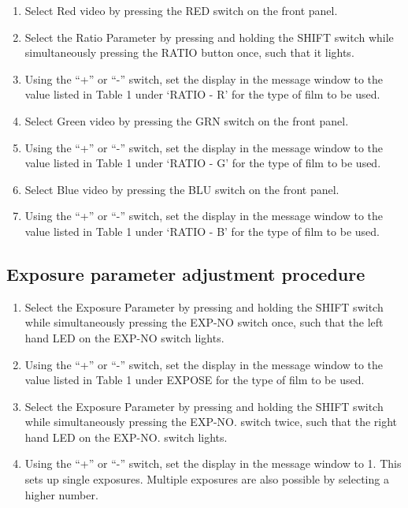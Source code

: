 \begin {enumerate}

\item Select Red video by pressing the RED switch on the front panel.

\item Select the Ratio Parameter by pressing and holding the SHIFT switch 
while simultaneously pressing the RATIO button once, such that it 
lights.

\item Using the ``+'' or ``-'' switch, set the display in the message window to
the value listed in Table 1 under `RATIO - R' for the type of film
to be used.

\item Select Green video by pressing the GRN switch on the front panel.

\item Using the ``+'' or ``-'' switch, set the display in the message window 
to the value listed in Table 1 under `RATIO - G' for the type 
of film to be used.

\item Select Blue video by pressing the BLU switch on the front panel.

\item Using the ``+'' or ``-'' switch, set the display in the message window to
the value listed in Table 1 under `RATIO - B' for the type of film 
to be used.

\end{enumerate}

\subsection {\bf Exposure parameter adjustment procedure}

\begin{enumerate}

\item Select the Exposure Parameter by pressing and holding the SHIFT switch
while simultaneously pressing the EXP-NO switch once, such that the
left hand LED on the EXP-NO switch lights.

\item Using the ``+'' or ``-'' switch, set the display in the message window to
the value listed in Table 1 under EXPOSE for the type of film to be
used.           
             
\item Select the Exposure Parameter by pressing and holding the SHIFT switch
while simultaneously pressing the EXP-NO. switch twice, such that the
right hand LED on the EXP-NO. switch lights.

\item Using the ``+'' or ``-'' switch, set the display in the message window to
1. This sets up single exposures. Multiple exposures are also possible by
selecting a higher number.
           
\end{enumerate}


